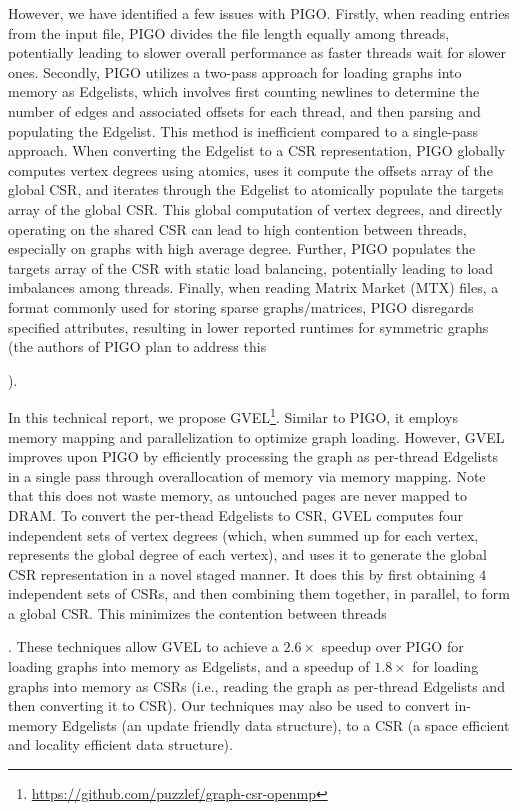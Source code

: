 However, we have identified a few issues with PIGO. Firstly, when reading entries from the input file, PIGO divides the file length equally among threads, potentially leading to slower overall performance as faster threads wait for slower ones. Secondly, PIGO utilizes a two-pass approach for loading graphs into memory as Edgelists, which involves first counting newlines to determine the number of edges and associated offsets for each thread, and then parsing and populating the Edgelist. This method is inefficient compared to a single-pass approach. When converting the Edgelist to a CSR representation, PIGO globally computes vertex degrees using atomics, uses it compute the offsets array of the global CSR, and iterates through the Edgelist to atomically populate the targets array of the global CSR. This global computation of vertex degrees, and directly operating on the shared CSR can lead to high contention between threads, especially on graphs with high average degree. Further, PIGO populates the targets array of the CSR with static load balancing, potentially leading to load imbalances among threads. Finally, when reading Matrix Market (MTX) files, a format commonly used for storing sparse graphs/matrices, PIGO disregards specified attributes, resulting in lower reported runtimes for symmetric graphs (the authors of PIGO plan to address this).

In this technical report, we propose GVEL\footnote{\url{https://github.com/puzzlef/graph-csr-openmp}}. Similar to PIGO, it employs memory mapping and parallelization to optimize graph loading. However, GVEL improves upon PIGO by efficiently processing the graph as per-thread Edgelists in a single pass through overallocation of memory via memory mapping. Note that this does not waste memory, as untouched pages are never mapped to DRAM. To convert the per-thead Edgelists to CSR, GVEL computes four independent sets of vertex degrees (which, when summed up for each vertex, represents the global degree of each vertex), and uses it to generate the global CSR representation in a novel staged manner. It does this by first obtaining $4$ independent sets of CSRs, and then combining them together, in parallel, to form a global CSR. This minimizes the contention between threads. These techniques allow GVEL to achieve a $2.6\times$ speedup over PIGO for loading graphs into memory as Edgelists, and a speedup of $1.8\times$ for loading graphs into memory as CSRs (i.e., reading the graph as per-thread Edgelists and then converting it to CSR). Our techniques may also be used to convert in-memory Edgelists (an update friendly data structure), to a CSR (a space efficient and locality efficient data structure).





